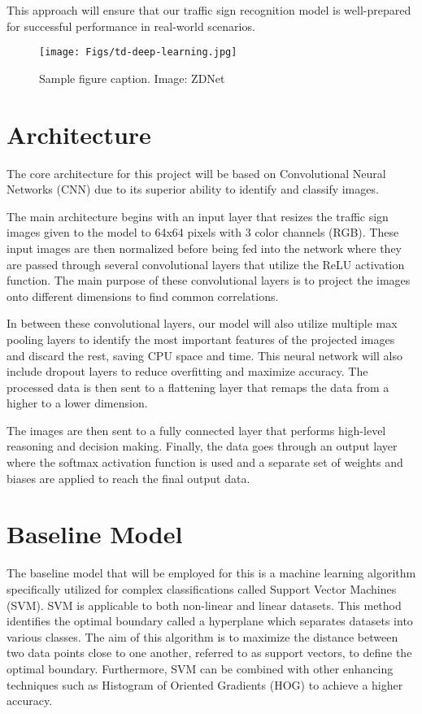 \documentclass{article} %
\begin{document}
This approach will ensure that our traffic sign recognition model is well-prepared for successful performance in real-world scenarios.


\begin{figure}[h]
\begin{center}
\texttt{[image: Figs/td-deep-learning.jpg]}
\end{center}
\caption{Sample figure caption. Image: ZDNet}
\end{figure}

\section{Architecture}
The core architecture for this project will be based on Convolutional Neural Networks (CNN) due to its superior ability to identify and classify images. 

The main architecture begins with an input layer that resizes the traffic sign images given to the model to 64x64 pixels with 3 color channels (RGB). These input images are then normalized before being fed into the network where they are passed through several convolutional layers that utilize the ReLU activation function. The main purpose of these convolutional layers is to project the images onto different dimensions to find common correlations. 

In between these convolutional layers, our model will also utilize multiple max pooling layers to identify the most important features of the projected images and discard the rest, saving CPU space and time. This neural network will also include dropout layers to reduce overfitting and maximize accuracy. The processed data is then sent to a flattening layer that remaps the data from a higher to a lower dimension. 

The images are then sent to a fully connected layer that performs high-level reasoning and decision making. Finally, the data goes through an output layer where the softmax activation function is used and a separate set of weights and biases are applied to reach the final output data.


\section{Baseline Model}
The baseline model that will be employed for this is a machine learning algorithm specifically utilized for complex classifications called Support Vector Machines (SVM). SVM is applicable to both non-linear and linear datasets. This method identifies the optimal boundary called a hyperplane which separates datasets into various classes. The aim of this algorithm is to maximize the distance between two data points close to one another, referred to as support vectors, to define the optimal boundary. Furthermore, SVM can be combined with other enhancing techniques such as Histogram of Oriented Gradients (HOG) to achieve a higher accuracy. 
\end{document}

